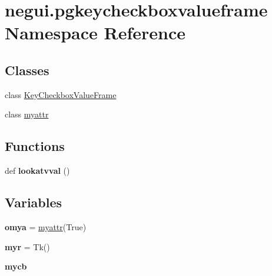 \hypertarget{namespacenegui_1_1pgkeycheckboxvalueframe}{}\section{negui.\+pgkeycheckboxvalueframe Namespace Reference}
\label{namespacenegui_1_1pgkeycheckboxvalueframe}
\subsection*{Classes}
\begin{DoxyCompactItemize}
\item 
class \hyperlink{classnegui_1_1pgkeycheckboxvalueframe_1_1KeyCheckboxValueFrame}{Key\+Checkbox\+Value\+Frame}
\item 
class \hyperlink{classnegui_1_1pgkeycheckboxvalueframe_1_1myattr}{myattr}
\end{DoxyCompactItemize}
\subsection*{Functions}
\begin{DoxyCompactItemize}
\item 
def {\bfseries lookatvval} ()\hypertarget{namespacenegui_1_1pgkeycheckboxvalueframe_aff0be15c8b88223feed19336c0aea99d}{}\label{namespacenegui_1_1pgkeycheckboxvalueframe_aff0be15c8b88223feed19336c0aea99d}

\end{DoxyCompactItemize}
\subsection*{Variables}
\begin{DoxyCompactItemize}
\item 
{\bfseries omya} = \hyperlink{classnegui_1_1pgkeycheckboxvalueframe_1_1myattr}{myattr}(True)\hypertarget{namespacenegui_1_1pgkeycheckboxvalueframe_aa0e19ba8bcdc436cb329c0f806852526}{}\label{namespacenegui_1_1pgkeycheckboxvalueframe_aa0e19ba8bcdc436cb329c0f806852526}

\item 
{\bfseries myr} = Tk()\hypertarget{namespacenegui_1_1pgkeycheckboxvalueframe_a8bcc124710039c9cb3cb23ae8921dfd3}{}\label{namespacenegui_1_1pgkeycheckboxvalueframe_a8bcc124710039c9cb3cb23ae8921dfd3}

\item 
{\bfseries mycb}
\end{DoxyCompactItemize}


